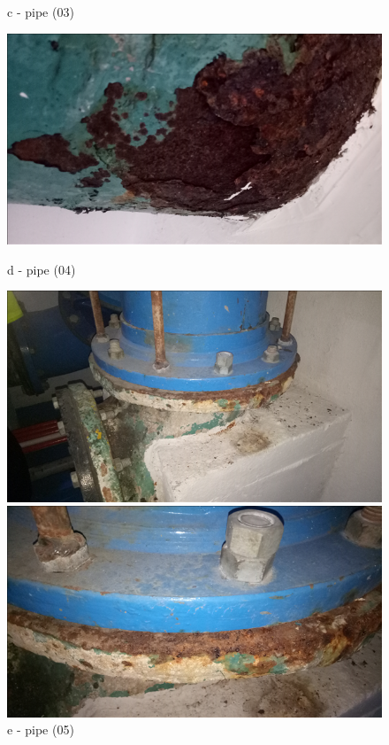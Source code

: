 \begin{figure}[!htb]
\begin{minipage}[b]{0.2\linewidth}
		\caption*{c - pipe (03)}
		\label{ch043_discharge_pipe_deteriorationC}
	\end{minipage}
	\begin{minipage}[b]{0.2\linewidth}
		\centering
		\includegraphics[width=\textwidth]{figures/ch043_discharge_pipe_deteriorationD}
		\caption*{d - pipe (04)}
		\label{ch043_discharge_pipe_deteriorationD}
	\end{minipage}
	\hspace{0.05cm}
	\begin{minipage}[b]{0.2\linewidth}
		\centering
		\includegraphics[width=\textwidth]{figures/ch043_discharge_pipe_deteriorationE}
		\caption*{e - pipe (05)}
		\label{ch043_discharge_pipe_deteriorationE}
	\end{minipage}
	\hspace{0.05cm}
	\begin{minipage}[b]{0.2\linewidth}
		\centering
		\includegraphics[width=\textwidth]{figures/ch043_discharge_pipe_deteriorationF}

\end{minipage}
\end{figure}
